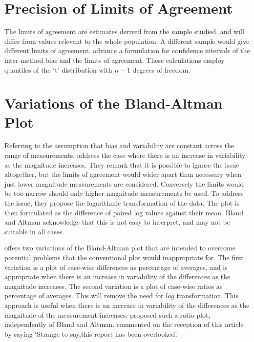 \documentclass[12pt, a4paper]{report}
\theoremstyle{plain}
\theoremstyle{definition}
\theoremstyle{remark}
\begin{document}

	\section{Precision of Limits of Agreement}
	The limits of agreement are estimates derived from the sample
	studied, and will differ from values relevant to the whole
	population. A different sample would give different limits of
	agreement. \citet*{BA86} advance a formulation for confidence
	intervals of the inter-method bias and the limits of agreement.
	These calculations employ quantiles of the `t' distribution with
	$n -1$ degrees of freedom.
	

	\section{Variations of the Bland-Altman Plot} Referring to the
	assumption that bias and variability are constant across the range
	of measurements, \citet{BA99} address the case where there is an
	increase in variability as the magnitude increases. They remark
	that it is possible to ignore the issue altogether, but the limits
	of agreement would wider apart than necessary when just lower
	magnitude measurements are considered. Conversely the limits would
	be too narrow should only higher magnitude measurements be used.
	To address the issue, they propose the logarithmic transformation
	of the data. The plot is then formulated as the difference of
	paired log values against their mean. Bland and Altman acknowledge
	that this is not easy to interpret, and may not be suitable in
	all cases.
	
	\citet{BA99} offers two variations of the Bland-Altman plot that
	are intended to overcome potential problems that the conventional
	plot would inappropriate for. The first variation is a plot of
	case-wise differences as percentage of averages, and is
	appropriate when there is an increase in variability of the
	differences as the magnitude increases. The second variation is a
	plot of case-wise ratios as percentage of averages. This will
	remove the need for $log$ transformation. This approach is useful
	when there is an increase in variability of the differences as the
	magnitude of the measurement increases. \citet{Eksborg} proposed
	such a ratio plot, independently of Bland and Altman.
	\citet{Dewitte} commented on the reception of this article by
	saying `Strange to say,this report has been overlooked'.
\end{document}
